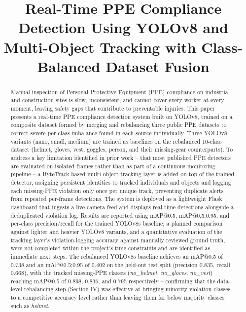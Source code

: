 \documentclass[conference]{IEEEtran}
\begin{document}
\title{Real-Time PPE Compliance Detection Using YOLOv8 and Multi-Object Tracking with Class-Balanced Dataset Fusion\\}

\author{
}

\maketitle

\begin{abstract}
Manual inspection of Personal Protective Equipment (PPE) compliance on industrial and construction sites is slow, inconsistent, and cannot cover every worker at every moment, leaving safety gaps that contribute to preventable injuries. This paper presents a real-time PPE compliance detection system built on YOLOv8, trained on a composite dataset formed by merging and rebalancing three public PPE datasets to correct severe per-class imbalance found in each source individually. Three YOLOv8 variants (nano, small, medium) are trained as baselines on the rebalanced 10-class dataset (helmet, gloves, vest, goggles, person, and their missing-gear counterparts). To address a key limitation identified in prior work -- that most published PPE detectors are evaluated on isolated frames rather than as part of a continuous monitoring pipeline -- a ByteTrack-based multi-object tracking layer is added on top of the trained detector, assigning persistent identities to tracked individuals and objects and logging each missing-PPE violation only once per unique track, preventing duplicate alerts from repeated per-frame detections. The system is deployed as a lightweight Flask dashboard that ingests a live camera feed and displays real-time detections alongside a deduplicated violation log. Results are reported using mAP@0.5, mAP@0.5:0.95, and per-class precision/recall for the trained YOLOv8s baseline; a planned comparison against lighter and heavier YOLOv8 variants, and a quantitative evaluation of the tracking layer's violation-logging accuracy against manually reviewed ground truth, were not completed within the project's time constraints and are identified as immediate next steps. The rebalanced YOLOv8s baseline achieves an mAP@0.5 of 0.738 and an mAP@0.5:0.95 of 0.402 on the held-out test split (precision 0.835, recall 0.668), with the tracked missing-PPE classes (\textit{no\_helmet}, \textit{no\_gloves}, \textit{no\_vest}) reaching mAP@0.5 of 0.898, 0.836, and 0.795 respectively -- confirming that the data-level rebalancing step (Section IV) was effective at bringing minority violation classes to a competitive accuracy level rather than leaving them far below majority classes such as \textit{helmet}.
\end{abstract}
\end{document}
